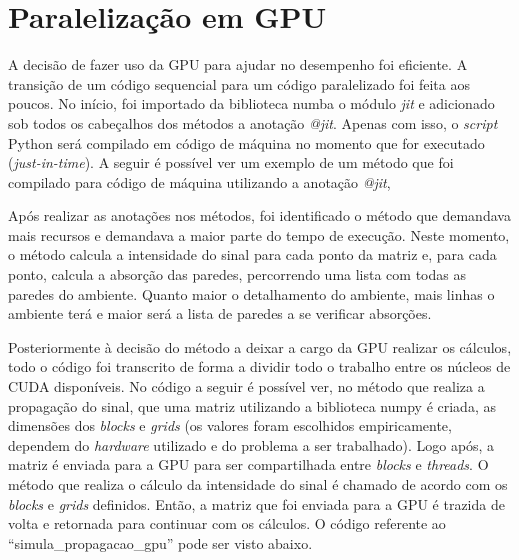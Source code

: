 \documentclass[
	12pt,				%
	twoside,			%
	a4paper,			%
	english,			%
	french,				%
	spanish,			%
	brazil				%
	]{abntex2}
\begin{document}
\clearpage

\section{Paralelização em GPU}\label{paralelizauxe7uxe3o-em-gpu}

A decisão de fazer uso da GPU para ajudar no desempenho foi eficiente. A
transição de um código sequencial para um código paralelizado foi feita
aos poucos. No início, foi importado da biblioteca numba o módulo
\emph{jit} e adicionado sob todos os cabeçalhos dos métodos a anotação
\emph{@jit}. Apenas com isso, o \emph{script} Python será compilado em
código de máquina no momento que for executado (\emph{just-in-time}). A
seguir é possível ver um exemplo de um método que foi compilado para
código de máquina utilizando a anotação \emph{@jit},

\begin{center}
    \noindent \fbox{
        
    }
\end{center}

Após realizar as anotações nos métodos, foi identificado o método que
demandava mais recursos e demandava a maior parte do tempo de execução.
Neste momento, o método calcula a intensidade do sinal para cada ponto
da matriz e, para cada ponto, calcula a absorção das paredes,
percorrendo uma lista com todas as paredes do ambiente. Quanto maior o
detalhamento do ambiente, mais linhas o ambiente terá e maior será a
lista de paredes a se verificar absorções.

Posteriormente à decisão do método a deixar a cargo da GPU realizar os
cálculos, todo o código foi transcrito de forma a dividir todo o
trabalho entre os núcleos de CUDA disponíveis. No código a seguir é
possível ver, no método que realiza a propagação do sinal, que uma
matriz utilizando a biblioteca numpy é criada, as dimensões dos
\emph{blocks} e \emph{grids} (os valores foram escolhidos empiricamente,
dependem do \emph{hardware} utilizado e do problema a ser trabalhado).
Logo após, a matriz é enviada para a GPU para ser compartilhada entre
\emph{blocks} e \emph{threads}. O método que realiza o cálculo da
intensidade do sinal é chamado de acordo com os \emph{blocks} e
\emph{grids} definidos. Então, a matriz que foi enviada para a GPU é
trazida de volta e retornada para continuar com os cálculos. O código
referente ao ``simula\_propagacao\_gpu'' pode ser visto abaixo.

\begin{center}
    \fbox{
        
    }
\end{center}
\end{document}

